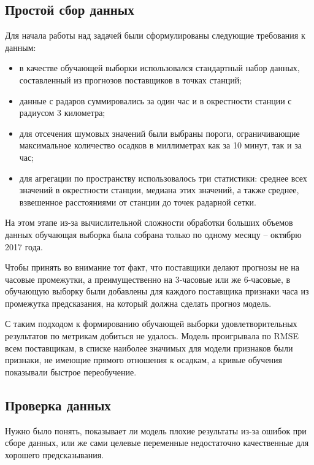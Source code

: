 \documentclass[14pt]{matmex-diploma}
\begin{document}
\subsection{Простой сбор данных}

Для начала работы над задачей были сформулированы следующие требования к данным:
\begin{itemize}
    \item в качестве обучающей выборки использовался стандартный набор данных, составленный из прогнозов поставщиков в точках станций;
    \item данные с радаров суммировались за один час и в окрестности станции с радиусом 3 километра;
    \item для отсечения шумовых значений были выбраны пороги, ограничивающие максимальное количество осадков в миллиметрах как за 10 минут, так и за час;
    \item для агрегации по пространству использовалось три статистики: среднее всех значений в окрестности станции, медиана этих значений, а также среднее, взвешенное расстояниями от станции до точек радарной сетки.
\end{itemize}

На этом этапе из-за вычислительной сложности обработки больших объемов данных обучающая выборка была собрана только по одному месяцу -- октябрю 2017 года.

Чтобы принять во внимание тот факт, что поставщики делают прогнозы не на часовые промежутки, а преимущественно на 3-часовые или же 6-часовые, в обучающую выборку были добавлены для каждого поставщика признаки часа из промежутка предсказания, на который должна сделать прогноз модель.

С таким подходом к формированию обучающей выборки удовлетворительных результатов по метрикам добиться не удалось. Модель проигрывала по RMSE всем поставщикам, в списке наиболее значимых для модели признаков были признаки, не имеющие прямого отношения к осадкам, а кривые обучения показывали быстрое переобучение.


\subsection{Проверка данных}

Нужно было понять, показывает ли модель плохие результаты из-за ошибок при сборе данных, или же сами целевые переменные недостаточно качественные для хорошего предсказывания.
\end{document}
